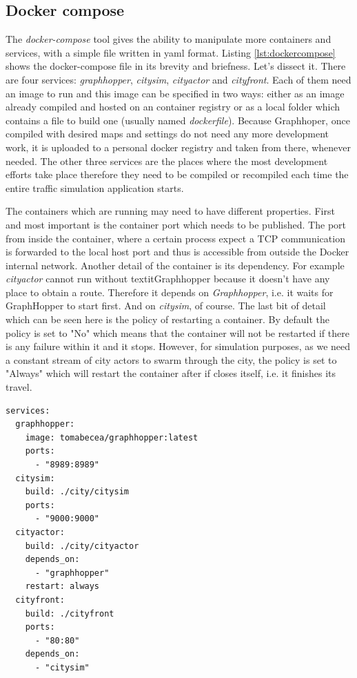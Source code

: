 \documentclass[conference]{IEEEtran}
\begin{document}
\subsection{Docker compose}

The \textit{docker-compose} tool gives the ability to manipulate more containers and services, with a simple file written in yaml format. Listing \ref{lst:dockercompose} shows the docker-compose file in its brevity and briefness. Let's dissect it. There are four services: \textit{graphhopper}, \textit{citysim}, \textit{cityactor} and \textit{cityfront}. Each of them need an image to run and this image can be specified in two ways: either as an image already compiled and hosted on an container registry or as a local folder which contains a file to build one (usually named \textit{dockerfile}). Because Graphhoper, once compiled with desired maps and settings do not need any more development work, it is uploaded to a personal docker registry and taken from there, whenever needed. The other three services are the places where the most development efforts take place therefore they need to be compiled or recompiled each time the entire traffic simulation application starts.

The containers which are running may need to have different properties. First and most important is the container port which needs to be published. The port from inside the container, where a certain process expect a TCP communication is forwarded to the local host port and thus is accessible from outside the Docker internal network. Another detail of the container is its dependency. For example \textit{cityactor} cannot run without textit{Graphhopper} because it doesn't have any place to obtain a route. Therefore it depends on \textit{Graphhopper}, i.e. it waits for GraphHopper to start first. And on \textit{citysim}, of course. The last bit of detail which can be seen here is the policy of restarting a container. By default the policy is set to "No" which means that the container will not be restarted if there is any failure within it and it stops. However, for simulation purposes, as we need a constant stream of city actors to swarm through the city, the policy is set to "Always" which will restart the container after if closes itself, i.e. it finishes its travel.

\begin{lstlisting}[caption=Docker-compose file, label=lst:dockercompose]
services:
  graphhopper:
    image: tomabecea/graphhopper:latest
    ports:
      - "8989:8989"
  citysim:
    build: ./city/citysim
    ports:
      - "9000:9000"
  cityactor:
    build: ./city/cityactor
    depends_on: 
      - "graphhopper"
    restart: always
  cityfront:
    build: ./cityfront
    ports:
      - "80:80"
    depends_on:
      - "citysim"
\end{lstlisting}
\end{document}
